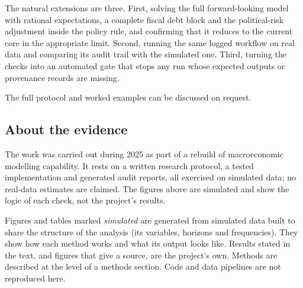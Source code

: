 \documentclass[
  british,
  a4paper,
]{article}
\begin{document}
The natural extensions are three. First, solving the full
forward-looking model with rational expectations, a complete fiscal debt
block and the political-risk adjustment inside the policy rule, and
confirming that it reduces to the current core in the appropriate limit.
Second, running the same logged workflow on real data and comparing its
audit trail with the simulated one. Third, turning the checks into an
automated gate that stops any run whose expected outputs or provenance
records are missing.

The full protocol and worked examples can be discussed on request.

\subsection{About the evidence}\label{about-the-evidence}

The work was carried out during 2025 as part of a rebuild of
macroeconomic modelling capability. It rests on a written research
protocol, a tested implementation and generated audit reports, all
exercised on simulated data; no real-data estimates are claimed. The
figures above are simulated and show the logic of each check, not the
project's results.

Figures and tables marked \emph{simulated} are generated from simulated
data built to share the structure of the analysis (its variables,
horizons and frequencies). They show how each method works and what its
output looks like. Results stated in the text, and figures that give a
source, are the project's own. Methods are described at the level of a
methods section. Code and data pipelines are not reproduced here.
\end{document}
